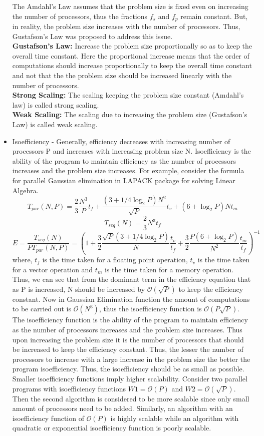 \documentclass[12pt]{book}
\begin{document}
\begin{itemize}
    The Amdahl's Law assumes that the problem size is fixed even on increasing the number of processors, thus the fractions $f_s$ and $f_p$ remain constant. 
    But, in reality, the problem size increases with the number of processors. Thus, Gustafson's Law was proposed to address this issue.\\
    \textbf{Gustafson's Law: }Increase the problem size proportionally so as to keep the overall time constant. Here the proportional increase means that the order of computations should increase proportionally to keep the overall time constant
    and not that the the problem size should be increased linearly with the number of processors.\\
    \textbf{Strong Scaling: }The scaling keeping the problem size constant (Amdahl's law) is called strong scaling.\\
    \textbf{Weak Scaling: }The scaling due to increasing the problem size (Gustafson's Law) is called weak scaling.
    \item Isoefficiency - Generally, efficiency decreases with increasing number of processors P and increases with increasing problem size N.
    Isoefficiency is the ability of the program to maintain efficiency as the number of processors increases and the problem size increases. For example, consider the formula for parallel Gaussian elimination in 
    LAPACK package for solving Linear Algebra.
    \[T_{par}(N,P)=\frac{2}{3} \frac{N^3}{P} t_f+ \frac{(3+1/4 \log_2 P)N^2}{\sqrt{P}}t_v+(6+ \log_2 P)Nt_m\]
    \[T_{seq}(N)=\frac{2}{3}N^3t_f\]
    \[E=\frac{T_{seq}(N)}{PT_{par}(N,P)}=(1+\frac{3}{2}\frac{\sqrt{P}(3+1/4\log_2 P)}{N}\frac{t_v}{t_f}+\frac{3}{2}\frac{P(6+\log_2 P)}{N^2}\frac{t_m}{t_f})^{-1}\]
    where, $t_f$ is the time taken for a floating point operation, $t_v$ is the time taken for a vector operation and $t_m$ is the time taken for a memory operation.
    Thus, we can see that from the dominant term in the efficiency equation that as P is increased, N should be increased by $\mathcal{O}(\sqrt{P})$ to keep the efficiency constant.
    Now in Gaussian Elimination function the amount of computations to be carried out is $\mathcal{O}(N^3)$, thus the isoefficiency function is $\mathcal{O}(P\sqrt{P})$. 
    The isoefficiency function is the ability of the program to maintain efficiency as the number of processors increases and the problem size increases. Thus upon increasing the problem size it is
    the number of processors that should be increased to keep the efficiency constant. Thus, the lesser the number of processors to increase with a large increase in the problem size the better the program isoefficiency.
    Thus, the isoefficiency should be as small as possible. Smaller isoefficiency functions imply higher scalability. Consider two parallel programs with isoefficiency functions $W1=\mathcal{O}(P)$ 
    and $W2=\mathcal{O}(\sqrt{P})$. Then the second algorithm is considered to be more scalable since only small amount of processors need to be added. Similarly, an algorithm with an isoefficiency 
    function of $\mathcal{O}(P)$ is highly scalable while an algorithm with quadratic or exponential isoefficiency function is poorly scalable.
\end{itemize}
\end{document}
